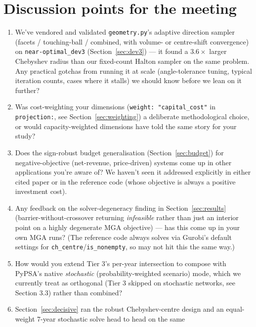 \documentclass[11pt]{article}
\begin{document}
\section{Discussion points for the meeting}
\begin{enumerate}[leftmargin=1.4em]
  \item We've vendored and validated \texttt{geometry.py}'s adaptive
    direction sampler (facets / touching-ball / combined, with volume- or
    centre-shift convergence) on \texttt{near-optimal\_dev3}
    (Section~\ref{sec:dev3}) --- it found a $3.6\times$ larger Chebyshev
    radius than our fixed-count Halton sampler on the same problem. Any
    practical gotchas from running it at scale (angle-tolerance tuning,
    typical iteration counts, cases where it stalls) we should know before
    we lean on it further?
  \item Was cost-weighting your dimensions
    (\texttt{weight: "capital\_cost"} in \texttt{projection:}, see
    Section~\ref{sec:weighting}) a deliberate methodological choice, or
    would capacity-weighted dimensions have told the same story for your
    study?
  \item Does the sign-robust budget generalisation
    (Section~\ref{sec:budget}) for negative-objective (net-revenue,
    price-driven) systems come up in other applications you're aware of?
    We haven't seen it addressed explicitly in either cited paper or in
    the reference code (whose objective is always a positive investment
    cost).
  \item Any feedback on the solver-degeneracy finding in
    Section~\ref{sec:results} (barrier-without-crossover returning
    \emph{infeasible} rather than just an interior point on a highly
    degenerate MGA objective) --- has this come up in your own MGA runs?
    (The reference code always solves via Gurobi's default settings for
    \texttt{ch\_centre}/\texttt{is\_nonempty}, so may not hit this the same
    way.)
  \item How would you extend Tier 3's per-year intersection to compose with
    PyPSA's native \emph{stochastic} (probability-weighted scenario) mode,
    which we currently treat as orthogonal (Tier 3 skipped on stochastic
    networks, see Section 3.3) rather than combined?
  \item Section~\ref{sec:decisive} ran the robust Chebyshev-centre design
    and an equal-weight 7-year stochastic solve head to head on the same

\end{enumerate}
\end{document}
